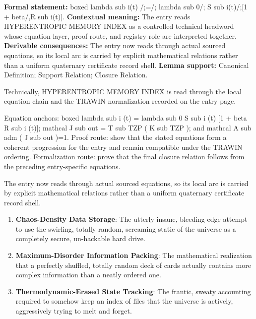 \begingroup\footnotesize\setlength{\emergencystretch}{3em}\sloppy
\textbf{Formal statement:} boxed lambda sub i(t) /;=/; lambda sub 0/; S sub i(t)/;[1 + beta/,R sub i(t)]. \textbf{Contextual meaning:} The entry reads HYPERENTROPIC MEMORY INDEX as a controlled technical headword whose equation layer, proof route, and registry role are interpreted together. \textbf{Derivable consequences:} The entry now reads through actual sourced equations, so its local arc is carried by explicit mathematical relations rather than a uniform quaternary certificate record shell. \textbf{Lemma support:} Canonical Definition; Support Relation; Closure Relation.\par
\endgroup

Technically, HYPERENTROPIC MEMORY INDEX is read through the local equation chain and the TRAWIN normalization recorded on the entry page.

Equation anchors: boxed lambda sub i (t) = lambda sub 0 S sub i (t) [1 + beta R sub i (t)]; mathcal J sub out = T sub TZP ( K sub TZP ); and mathcal A sub adm ( J sub out )=1. Proof route: show that the stated equations form a coherent progression for the entry and remain compatible under the TRAWIN ordering. Formalization route: prove that the final closure relation follows from the preceding entry-specific equations.

The entry now reads through actual sourced equations, so its local arc is carried by explicit mathematical relations rather than a uniform quaternary certificate record shell.
\endgroup

\begin{enumerate}[leftmargin=1.6em,itemsep=6pt,topsep=4pt]
\item \textbf{Chaos-Density Data Storage}: The utterly insane, bleeding-edge attempt to use the swirling, totally random, screaming static of the universe as a completely secure, un-hackable hard drive.
\item \textbf{Maximum-Disorder Information Packing}: The mathematical realization that a perfectly shuffled, totally random deck of cards actually contains more complex information than a neatly ordered one.
\item \textbf{Thermodynamic-Erased State Tracking}: The frantic, sweaty accounting required to somehow keep an index of files that the universe is actively, aggressively trying to melt and forget.
\end{enumerate}

